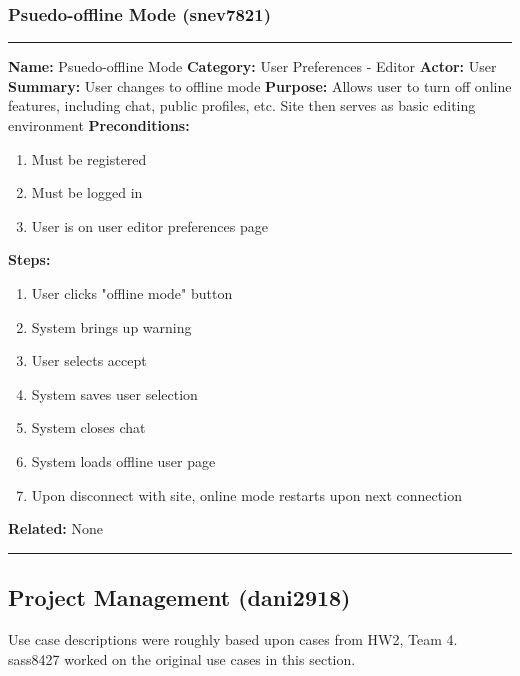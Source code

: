 \documentclass[11pt]{report}
\begin{document}
\subsubsection{Psuedo-offline Mode (snev7821)}
\vspace{2pt}
\hrule
\vspace{8pt}
	\noindent\textbf{Name:} Psuedo-offline Mode \newline
	\textbf{Category:} User Preferences - Editor  \newline
	\textbf{Actor:} User \newline
	\textbf{Summary:} User changes to offline mode \newline
	\textbf{Purpose:} Allows user to turn off online features, including chat, public profiles, etc. Site then serves as basic editing environment\newline
	\textbf{Preconditions:}
	\begin{enumerate}
		\item Must be registered
		\item Must be logged in
		\item User is on user editor preferences page
	\end{enumerate}
	\textbf{Steps:}
	\begin{enumerate}
		\item User clicks "offline mode" button
		\item System brings up warning
		\item User selects accept
		\item System saves user selection
		\item System closes chat
		\item System loads offline user page
		\item Upon disconnect with site, online mode restarts upon next connection
	\end{enumerate}
	\textbf{Related:} None
\vspace{8pt}
\hrule
\newpage

\subsection{Project Management (dani2918)}
Use case descriptions were roughly based upon cases from HW2, Team 4. sass8427 worked on the original use cases in this section.
\end{document}
